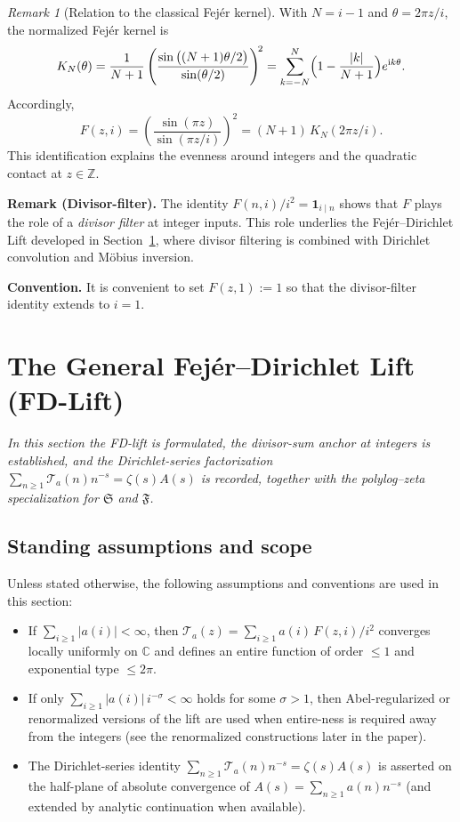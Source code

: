 \documentclass[11pt,a4paper]{amsart}
\newcommand{\C}{\mathbb{C}}
\newcommand{\ii}{\mathrm{i}}
\theoremstyle{plain}
\theoremstyle{definition}
\theoremstyle{remark}
\newtheorem{remark}[theorem]{Remark}
\begin{document}
\begin{remark}[Relation to the classical Fej\'er kernel]
With $N=i-1$ and $\theta=2\pi z/i$, the normalized Fej\'er kernel is
\[
K_N(\theta)=\frac{1}{N+1}\left(\frac{\sin\big((N+1)\theta/2\big)}{\sin(\theta/2)}\right)^{\!2}
=\sum_{k=-N}^{N}\Bigl(1-\frac{|k|}{N+1}\Bigr)e^{\ii k\theta}.
\]
Accordingly,
\[
F(z,i)=\left(\frac{\sin(\pi z)}{\sin(\pi z/i)}\right)^{\!2}
=(N+1)\,K_N(2\pi z/i).
\]
This identification explains the evenness around integers and the quadratic contact at $z\in\mathbb Z$.
\end{remark}


\noindent\textbf{Remark (Divisor-filter).} The identity $F(n,i)/i^2=\mathbf{1}_{i\mid n}$ shows that $F$ plays the role of a \emph{divisor filter} at integer inputs.
This role underlies the Fej\'er--Dirichlet Lift developed in Section~\ref{sec:fd-lift-main}, where divisor filtering is combined with Dirichlet convolution and M\"obius inversion.

\medskip
\noindent\textbf{Convention.} It is convenient to set $F(z,1):=1$ so that the divisor-filter identity extends to $i=1$.


\section{The General Fej\'er--Dirichlet Lift (FD-Lift)}\label{sec:fd-lift-main}

\par\smallskip
\noindent\textit{In this section the FD-lift is formulated, the divisor-sum anchor at integers is established, and the Dirichlet-series factorization $\sum_{n\ge1}\mathcal T_a(n)n^{-s}=\zeta(s)A(s)$ is recorded, together with the polylog–zeta specialization for $\mathfrak S$ and $\mathfrak F$.}
\par\medskip

\subsection*{Standing assumptions and scope}
\noindent Unless stated otherwise, the following assumptions and conventions are used in this section:
\begin{itemize}
  \item If $\sum_{i\ge1}|a(i)|<\infty$, then $\mathcal T_a(z)=\sum_{i\ge1} a(i)\,F(z,i)/i^2$ converges locally uniformly on $\C$ and defines an entire function of order $\le 1$ and exponential type $\le 2\pi$.
  \item If only $\sum_{i\ge1} |a(i)|\,i^{-\sigma}<\infty$ holds for some $\sigma>1$, then Abel-regularized or renormalized versions of the lift are used when entire-ness is required away from the integers (see the renormalized constructions later in the paper).
  \item The Dirichlet-series identity $\sum_{n\ge1}\mathcal T_a(n)n^{-s}=\zeta(s)A(s)$ is asserted on the half-plane of absolute convergence of $A(s)=\sum_{n\ge1}a(n)n^{-s}$ (and extended by analytic continuation when available).
\end{itemize}
\end{document}
